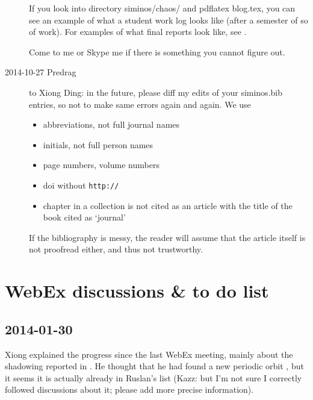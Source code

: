 \begin{description}
If you look into directory
siminos/chaos/ and pdflatex blog.tex, you can see an example of what
a student work log looks like (after a semester of so of work).
For examples of
what final reports look like, see .

Come to me or Skype me if there is something you
cannot figure out.

\item[2014-10-27 Predrag]
to Xiong Ding: in the future, please diff my edits of your siminos.bib
entries, so not to make same errors again and again. We use
\begin{itemize}
  \item abbreviations, not full journal names
  \item initials, not full person names
  \item page numbers, volume numbers
  \item doi without \texttt{http://}
  \item chapter in a collection is not cited as an article with the title of
         the book cited as `journal'
\end{itemize}
If the bibliography is messy, the reader will assume that the article
itself is not proofread either, and thus not trustworthy.
\end{description}

    \newpage

    \newpage

    \newpage

    \newpage

    \newpage

    \newpage

    \clearpage

    \clearpage

    \clearpage

    \clearpage
    \clearpage


\section{WebEx discussions \& to do list}

\subsection{2014-01-30}

Xiong explained the progress since the last WebEx meeting,
mainly about the shadowing reported in .
He thought that he had found a new periodic orbit ,
but it seems it is actually already in Ruslan's list
(Kazz: but I'm not sure I correctly followed discussions about it;
please add more precise information).

